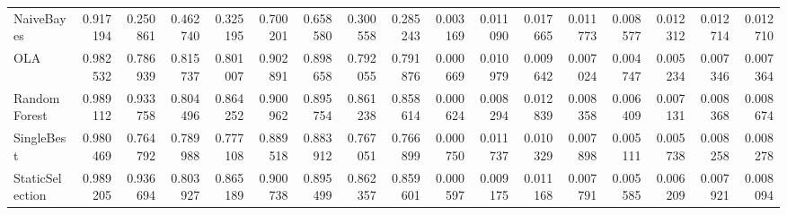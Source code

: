 \begin{tabular}{lrrrrrrrrrrrrrrrr}
NaiveBayes & 0.917194 & 0.250861 & 0.462740 & 0.325195 & 0.700201 & 0.658580 & 0.300558 & 0.285243 & 0.003169 & 0.011090 & 0.017665 & 0.011773 & 0.008577 & 0.012312 & 0.012714 & 0.012710 \\
OLA & 0.982532 & 0.786939 & 0.815737 & 0.801007 & 0.902891 & 0.898658 & 0.792055 & 0.791876 & 0.000669 & 0.010979 & 0.009642 & 0.007024 & 0.004747 & 0.005234 & 0.007346 & 0.007364 \\
RandomForest & 0.989112 & 0.933758 & 0.804496 & 0.864252 & 0.900962 & 0.895754 & 0.861238 & 0.858614 & 0.000624 & 0.008294 & 0.012839 & 0.008358 & 0.006409 & 0.007131 & 0.008368 & 0.008674 \\
SingleBest & 0.980469 & 0.764792 & 0.789988 & 0.777108 & 0.889518 & 0.883912 & 0.767051 & 0.766899 & 0.000750 & 0.011737 & 0.010329 & 0.007898 & 0.005111 & 0.005738 & 0.008258 & 0.008278 \\
StaticSelection & 0.989205 & 0.936694 & 0.803927 & 0.865189 & 0.900738 & 0.895499 & 0.862357 & 0.859601 & 0.000597 & 0.009175 & 0.011168 & 0.007791 & 0.005585 & 0.006209 & 0.007921 & 0.008094 \\
\bottomrule
\end{tabular}
